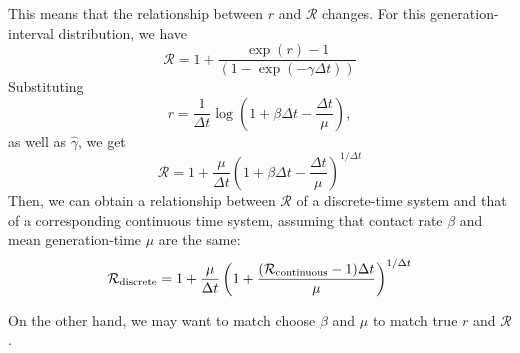 \documentclass{article}
\begin{document}
This means that the relationship between $r$ and $\mathcal R$ changes.
For this generation-interval distribution, we have
\begin{equation}
\mathcal R = 1 + \frac{\exp(r) -1}{(1-\exp(-\gamma \Delta t)) }
\end{equation}
Substituting 
\begin{equation}
r = \frac{1}{\Delta t} \log \left(1 + \beta \Delta t - \frac{\Delta t}{\mu}\right),
\end{equation}
as well as $\hat \gamma$, we get
\begin{equation}
\mathcal R = 1 + \frac{\mu}{\Delta t} \left(1 + \beta \Delta t - \frac{\Delta t}{\mu}\right)^{1/\Delta t}
\end{equation}
Then, we can obtain a relationship between $\mathcal R$ of a discrete-time system and that of a corresponding continuous time system, assuming that contact rate $\beta$ and mean generation-time $\mu$ are the same:
\begin{equation}
\mathcal R_{\tiny \textrm{discrete}} = 1 + \frac{\mu}{\Delta t} \left(1 + \frac{(\mathcal R_{\tiny \textrm{continuous}}  - 1) \Delta t }{\mu}\right)^{1/\Delta t}
\end{equation}

On the other hand, we may want to match choose $\beta$ and $\mu$ to match true $r$ and $\mathcal R$.
\end{document}
